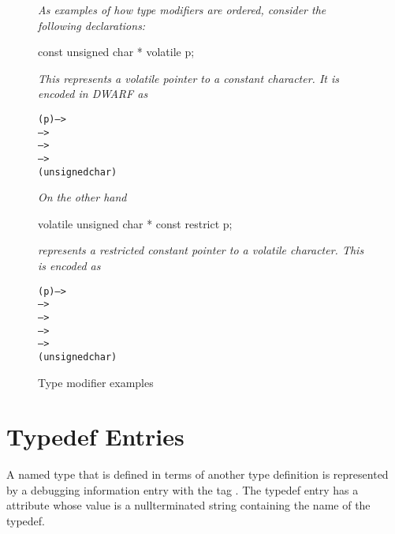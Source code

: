 \begin{figure}[t]
\textit{As examples of how type modifiers are ordered, consider the following
 declarations:}
\par %
\begin{nlnlisting}
    const unsigned char * volatile p;
\end{nlnlisting}

\textit{This represents a volatile pointer to a constant
character. It is encoded in DWARF as}
\par %
\nolinenumbers
\begin{dwflisting}
\begin{alltt}
        \DWTAGvariable(p) -->
            \DWTAGvolatiletype -->
                \DWTAGpointertype -->
                    \DWTAGconsttype -->
                        \DWTAGbasetype(unsigned char)
\end{alltt}
\end{dwflisting}

\textit{On the other hand}
\begin{nlnlisting}
    volatile unsigned char * const restrict p;
\end{nlnlisting}
\textit{represents a restricted constant
pointer to a volatile character. This is encoded as}
\begin{dwflisting}
\begin{alltt}
        \DWTAGvariable(p) -->
            \DWTAGrestricttype -->
                \DWTAGconsttype -->
                    \DWTAGpointertype -->
                        \DWTAGvolatiletype -->
                            \DWTAGbasetype(unsigned char)
\end{alltt}
\end{dwflisting}

\caption{Type modifier examples}
\label{fig:typemidifierexamples}
\end{figure}

\section{Typedef Entries}
\label{chap:typedefentries}
A named type that is defined in terms of another type
definition is represented by a debugging information entry with
the tag \DWTAGtypedefTARG.
The typedef entry has a \DWATname{} attribute
whose value is a null\dash terminated string containing
the name of the typedef.


